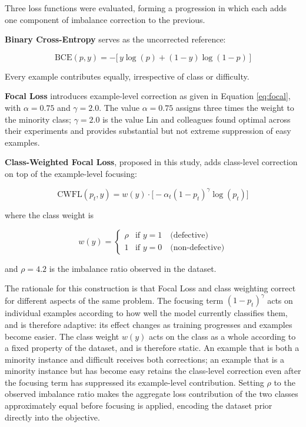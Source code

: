 \documentclass[12pt,a4paper,oneside]{report}
\begin{document}
Three loss functions were evaluated, forming a progression in which each adds one component of imbalance correction to the previous.

\textbf{Binary Cross-Entropy} serves as the uncorrected reference:

\begin{equation}
\mathrm{BCE}(p, y) = -\bigl[\, y \log(p) + (1 - y)\log(1 - p) \,\bigr]
\label{eq:bce}
\end{equation}

Every example contributes equally, irrespective of class or difficulty.

\textbf{Focal Loss} \cite{lin2017} introduces example-level correction as given in Equation \ref{eq:focal}, with $\alpha = 0.75$ and $\gamma = 2.0$. The value $\alpha = 0.75$ assigns three times the weight to the minority class; $\gamma = 2.0$ is the value Lin and colleagues found optimal across their experiments and provides substantial but not extreme suppression of easy examples.

\textbf{Class-Weighted Focal Loss}, proposed in this study, adds class-level correction on top of the example-level focusing:

\begin{equation}
\mathrm{CWFL}(p_t, y) = w(y) \cdot \bigl[ -\alpha_t (1 - p_t)^{\gamma} \log(p_t) \bigr]
\label{eq:cwfl}
\end{equation}

where the class weight is

\begin{equation}
w(y) =
\begin{cases}
\rho & \text{if } y = 1 \quad \text{(defective)} \\
1 & \text{if } y = 0 \quad \text{(non-defective)}
\end{cases}
\label{eq:weight}
\end{equation}

and $\rho = 4.2$ is the imbalance ratio observed in the dataset.

The rationale for this construction is that Focal Loss and class weighting correct for different aspects of the same problem. The focusing term $(1 - p_t)^{\gamma}$ acts on individual examples according to how well the model currently classifies them, and is therefore adaptive: its effect changes as training progresses and examples become easier. The class weight $w(y)$ acts on the class as a whole according to a fixed property of the dataset, and is therefore static. An example that is both a minority instance and difficult receives both corrections; an example that is a minority instance but has become easy retains the class-level correction even after the focusing term has suppressed its example-level contribution. Setting $\rho$ to the observed imbalance ratio makes the aggregate loss contribution of the two classes approximately equal before focusing is applied, encoding the dataset prior directly into the objective.
\end{document}
